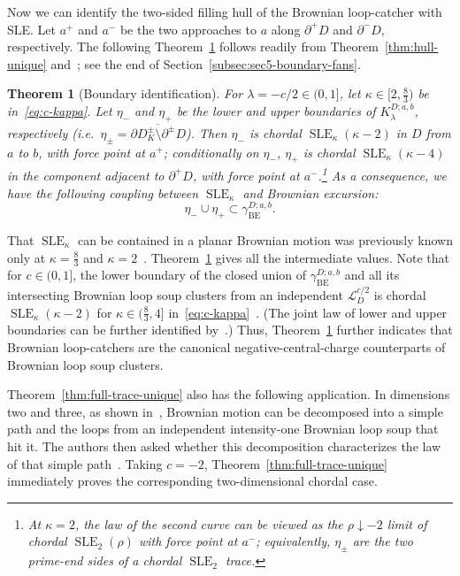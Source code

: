 \documentclass[11pt]{article}
\numberwithin{equation}{section}
\newcommand{\cL}{\mathcal{L}}
\newcommand{\1}{\mathbf{1}}
\newcommand{\BE}{\mathrm{BE}}
\DeclareMathOperator{\SLE}{SLE}
\newtheorem{theorem}{Theorem}[section]
\newcommand\ol[1]{\overline{#1}}
\begin{document}
Now we can identify the two-sided filling hull of the Brownian loop-catcher with SLE.  Let \(a^+\) and \(a^-\) be the two approaches to
\(a\) along \(\partial^+D\) and \(\partial^-D\), respectively. The following Theorem~\ref{thm:sle} follows readily from Theorem~\ref{thm:hull-unique} and~\cite[Proposition~6.2]{qian2021generalized}; see the end of Section~\ref{subsec:sec5-boundary-fans}.
\begin{theorem}[Boundary identification]\label{thm:sle}
For \(\lambda=-c/2\in(0,1]\), let
\(\kappa\in[2,\frac83)\) be in~\eqref{eq:c-kappa}.  
Let $\eta_-$ and $\eta_+$ be the lower and upper boundaries of \(K_\lambda^{D;a,b}\), respectively (i.e.~$\eta_\pm=\ol{\partial D_K^\pm\setminus \partial^\pm D}$). Then \(\eta_-\) is chordal
\(\SLE_\kappa(\kappa-2)\) in \(D\) from \(a\) to \(b\), with force point
at \(a^+\); conditionally on \(\eta_-\), \(\eta_+\) is chordal \(\SLE_\kappa(\kappa-4)\) in the component adjacent
to \(\partial^+D\),
with force point at \(a^-\).\footnote{At \(\kappa=2\), the law of the second curve
can be viewed as the \(\rho\downarrow-2\) limit of chordal \(\SLE_2(\rho)\) with force
point at \(a^-\); equivalently, $\eta_\pm$ are the two prime-end sides
of a chordal \(\SLE_2\) trace.} As a consequence, we have the following coupling between $\SLE_\kappa$ and Brownian excursion:
\[
 \eta_-\cup\eta_+\subset\gamma_{\BE}^{D;a,b}.
\]
\end{theorem}





That $\SLE_\kappa$ can be contained in a planar Brownian motion was previously known only at \(\kappa=\frac83\) \cite{lsw-restriction}
and \(\kappa=2\)~\cite{zhan2010}.
Theorem~\ref{thm:sle} gives all the intermediate values. Note that for $c\in(0,1]$, the lower boundary of the closed union of $\gamma_{\BE}^{D;a,b}$ and all its intersecting Brownian loop soup clusters from an independent $\cL_D^{c/2}$ is chordal $\SLE_\kappa(\kappa-2)$ for $\kappa\in(\frac{8}{3},4]$ in~\eqref{eq:c-kappa}~\cite{werner-wu-cle-sle}. (The joint law of lower and upper boundaries can be further identified by~\cite{CG25}.) Thus, Theorem~\ref{thm:sle} further indicates that Brownian loop-catchers are the canonical negative-central-charge counterparts of Brownian loop soup clusters.







Theorem~\ref{thm:full-trace-unique} also has the following application. In dimensions two and three, as shown in~\cite{SS18}, Brownian motion can be decomposed into a simple path and the loops from an independent intensity-one Brownian loop soup that hit it. The authors then asked whether this decomposition characterizes the law of that simple path~\cite[Conjecture~1.3]{SS18}. Taking $c=-2$, Theorem~\ref{thm:full-trace-unique} immediately proves the corresponding two-dimensional chordal case.
\end{document}

